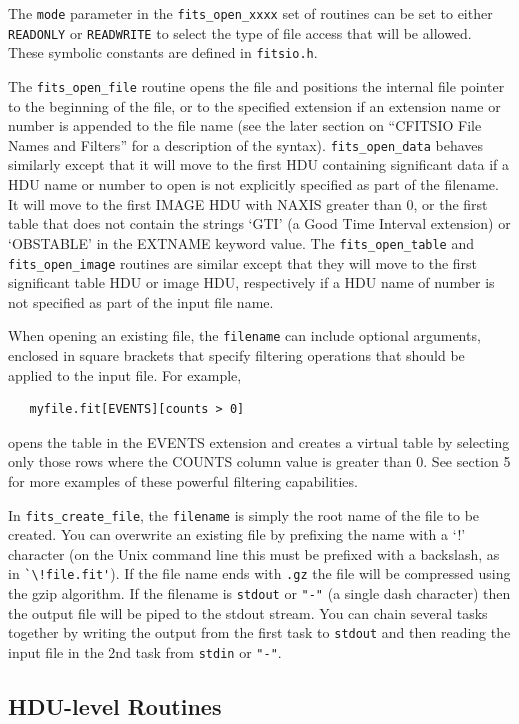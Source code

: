 \documentclass[11pt]{article}
\begin{document}
The {\tt mode} parameter in the {\tt fits\_open\_xxxx} set of routines
can be set to either {\tt READONLY} or {\tt READWRITE} to select the
type of file access that will be allowed. These symbolic constants are
defined in {\tt fitsio.h}.

The {\tt fits\_open\_file} routine opens the file and positions the internal
file pointer to the beginning of the file, or to the specified
extension if an extension name or number is appended to the file name
(see the later section on ``CFITSIO File Names and Filters'' for a
description of the syntax). {\tt fits\_open\_data} behaves similarly except
that it will move to the first HDU containing significant data if a HDU
name or number to open is not explicitly specified as part of the
filename.  It will move to the first IMAGE HDU with NAXIS greater than
0, or the first table that does not contain the strings `GTI' (a Good
Time Interval extension) or `OBSTABLE' in the EXTNAME keyword value.
The {\tt fits\_open\_table} and {\tt fits\_open\_image}  routines are similar
except that they will move to the first significant table HDU or image
HDU, respectively if a HDU name of number is not specified as part of
the input file name.

When opening an existing file, the {\tt filename} can include optional
arguments, enclosed in square brackets that specify filtering
operations that should be applied to the input file.  For example,
\begin{verbatim}
   myfile.fit[EVENTS][counts > 0]
\end{verbatim}
opens the table in the EVENTS extension and creates a virtual table by
selecting only those rows where the COUNTS column value is greater than
0.  See section 5 for more examples of these powerful filtering
capabilities.

In {\tt fits\_create\_file},  the {\tt filename} is simply the root name of
the file to be created.  You can overwrite an existing file by
prefixing the name with a `!' character (on the Unix command line this
must be prefixed with a backslash, as in \verb+`\!file.fit'+).
If the file name ends with {\tt .gz} the file will be compressed
using the gzip algorithm.  If the
filename is {\tt stdout} or {\tt "-"} (a single dash character)
then the output file will be piped to the stdout stream.  You can
chain several tasks together by writing the output from the first task
to {\tt stdout} and then reading the input file in the 2nd task from
{\tt stdin} or {\tt "-"}.


{\bf \subsection{HDU-level Routines}}
\end{document}
